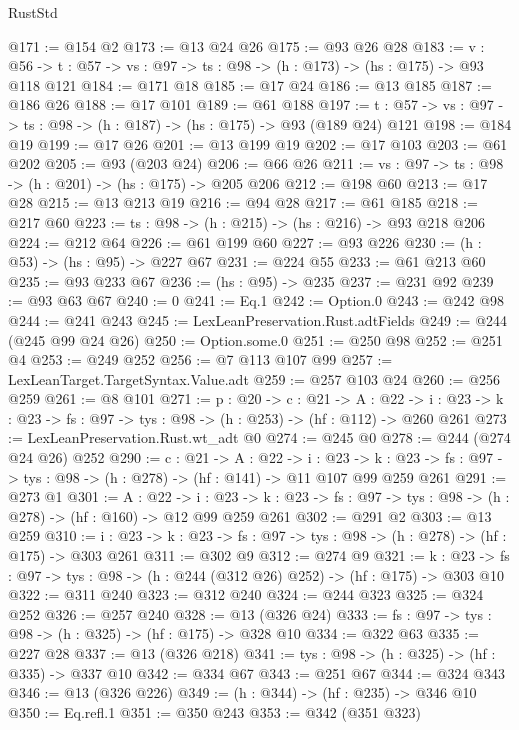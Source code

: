 \begin{lexlean}{RustStd}
\begin{coremodule}
@171 := @154 @2
@173 := @13 @24 @26
@175 := @93 @26 @28
@183 := {v : @56} ->
  {t : @57} -> {vs : @97} -> {ts : @98} -> (h : @173) -> (hs : @175) -> @93 @118 @121
@184 := @171 @18
@185 := @17 @24
@186 := @13 @185
@187 := @186 @26
@188 := @17 @101
@189 := @61 @188
@197 := {t : @57} -> {vs : @97} -> {ts : @98} -> (h : @187) -> (hs : @175) -> @93 (@189 @24) @121
@198 := @184 @19
@199 := @17 @26
@201 := @13 @199 @19
@202 := @17 @103
@203 := @61 @202
@205 := @93 (@203 @24)
@206 := @66 @26
@211 := {vs : @97} -> {ts : @98} -> (h : @201) -> (hs : @175) -> @205 @206
@212 := @198 @60
@213 := @17 @28
@215 := @13 @213 @19
@216 := @94 @28
@217 := @61 @185
@218 := @217 @60
@223 := {ts : @98} -> (h : @215) -> (hs : @216) -> @93 @218 @206
@224 := @212 @64
@226 := @61 @199 @60
@227 := @93 @226
@230 := (h : @53) -> (hs : @95) -> @227 @67
@231 := @224 @55
@233 := @61 @213 @60
@235 := @93 @233 @67
@236 := (hs : @95) -> @235
@237 := @231 @92
@239 := @93 @63 @67
@240 := 0
@241 := Eq.{1}
@242 := Option.{0}
@243 := @242 @98
@244 := @241 @243
@245 := LexLeanPreservation.Rust.adtFields
@249 := @244 (@245 @99 @24 @26)
@250 := Option.some.{0}
@251 := @250 @98
@252 := @251 @4
@253 := @249 @252
@256 := @7 @113 @107 @99
@257 := LexLeanTarget.TargetSyntax.Value.adt
@259 := @257 @103 @24
@260 := @256 @259
@261 := @8 @101
@271 := {p : @20} ->
  {c : @21} ->
  {A : @22} ->
  {i : @23} -> {k : @23} -> {fs : @97} -> {tys : @98} -> (h : @253) -> (hf : @112) -> @260 @261
@273 := LexLeanPreservation.Rust.wt_adt @0
@274 := @245 @0
@278 := @244 (@274 @24 @26) @252
@290 := {c : @21} ->
  {A : @22} ->
  {i : @23} ->
  {k : @23} -> {fs : @97} -> {tys : @98} -> (h : @278) -> (hf : @141) -> @11 @107 @99 @259 @261
@291 := @273 @1
@301 := {A : @22} ->
  {i : @23} ->
  {k : @23} -> {fs : @97} -> {tys : @98} -> (h : @278) -> (hf : @160) -> @12 @99 @259 @261
@302 := @291 @2
@303 := @13 @259
@310 := {i : @23} ->
  {k : @23} -> {fs : @97} -> {tys : @98} -> (h : @278) -> (hf : @175) -> @303 @261
@311 := @302 @9
@312 := @274 @9
@321 := {k : @23} ->
  {fs : @97} -> {tys : @98} -> (h : @244 (@312 @26) @252) -> (hf : @175) -> @303 @10
@322 := @311 @240
@323 := @312 @240
@324 := @244 @323
@325 := @324 @252
@326 := @257 @240
@328 := @13 (@326 @24)
@333 := {fs : @97} -> {tys : @98} -> (h : @325) -> (hf : @175) -> @328 @10
@334 := @322 @63
@335 := @227 @28
@337 := @13 (@326 @218)
@341 := {tys : @98} -> (h : @325) -> (hf : @335) -> @337 @10
@342 := @334 @67
@343 := @251 @67
@344 := @324 @343
@346 := @13 (@326 @226)
@349 := (h : @344) -> (hf : @235) -> @346 @10
@350 := Eq.refl.{1}
@351 := @350 @243
@353 := @342 (@351 @323)

\end{coremodule}
\end{lexlean}
